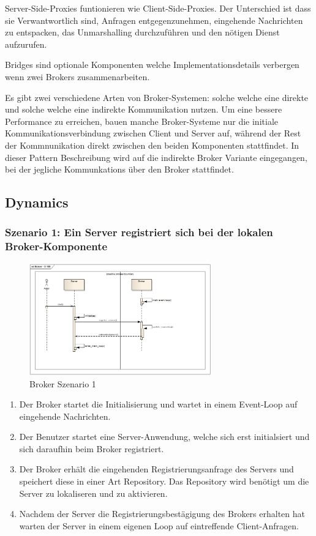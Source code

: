 Server-Side-Proxies funtionieren wie Client-Side-Proxies. Der Unterschied ist dass sie Verwantwortlich sind, Anfragen entgegenzunehmen, eingehende Nachrichten zu entspacken, das Unmarshalling durchzuführen und den nötigen Dienst aufzurufen.

Bridges sind optionale Komponenten welche Implementationsdetails verbergen wenn zwei Brokers zusammenarbeiten.

Es gibt zwei verschiedene Arten von Broker-Systemen: solche welche eine direkte und solche welche eine indirekte Kommunikation nutzen. Um eine bessere Performance zu erreichen, bauen manche Broker-Systeme nur die initiale Kommunikationsverbindung zwischen Client und Server auf, während der Rest der Kommnunikation direkt zwischen den beiden Komponenten stattfindet. In dieser Pattern Beschreibung wird auf die indirekte Broker Variante eingegangen, bei der jegliche Kommunkations über den Broker stattfindet.

\subsection*{Dynamics}

\subsubsection*{Szenario 1: Ein Server registriert sich bei der lokalen Broker-Komponente}

\begin{figure}[H]
	\centering
	\includegraphics[width=0.7\textwidth]{content/posa1/images/broker-scen1.png}
	\caption{Broker Szenario 1}
\end{figure}

\begin{enumerate}
	\item Der Broker startet die Initialisierung und wartet in einem Event-Loop auf eingehende Nachrichten.
	\item Der Benutzer startet eine Server-Anwendung, welche sich erst initialsiert und sich daraufhin beim Broker registriert.
	\item Der Broker erhält die eingehenden Registrierungsanfrage des Servers und speichert diese in einer Art Repository. Das Repository wird benötigt um die Server zu lokaliseren und zu aktivieren.
	\item Nachdem der Server die Registrierungsbestägigung des Brokers erhalten hat warten der Server in einem eigenen Loop auf eintreffende Client-Anfragen.
\end{enumerate}


